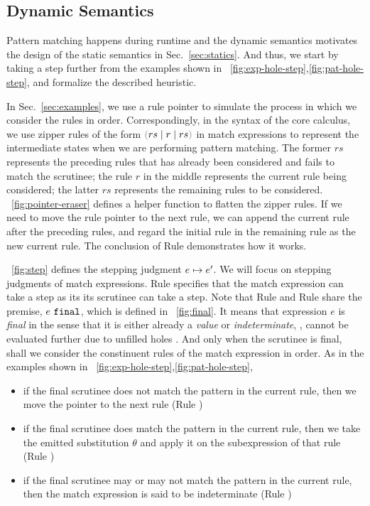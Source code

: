 \documentclass[runningheads,envcountsame,a4paper]{llncs}
\begin{document}
\subsection{Dynamic Semantics}\label{sec:dynamics}
Pattern matching happens during runtime and the dynamic semantics motivates the
design of the static semantics in Sec.~\ref{sec:statics}. And thus, we start by
taking a step further from the examples shown in
\listfigurename~\ref{fig:exp-hole-step},\ref{fig:pat-hole-step}, and formalize
the described heuristic.




In Sec.~\ref{sec:examples}, we use a rule pointer to simulate the process in
which we consider the rules in order. Correspondingly, in the syntax of the core
calculus, we use zipper rules of the form $\zrulsP{rs}{r}{rs}$ in match
expressions to represent the intermediate states when we are performing pattern
matching. The former $rs$ represents the preceding rules that has already been
considered and fails to match the scrutinee; the rule $r$ in the middle
represents the current rule being considered; the latter $rs$ represents the
remaining rules to be considered. \figurename~\ref{fig:pointer-eraser} defines a
helper function to flatten the zipper rules. If we need to move the rule pointer
to the next rule, we can append the current rule after the preceding rules, and
regard the initial rule in the remaining rule as the new current rule. The
conclusion of Rule \ITFailMatch demonstrates how it works.



\figurename~\ref{fig:step} defines the stepping judgment
$e \mapsto e'$. We will focus on stepping judgments of match expressions.
Rule \ITExpMatch specifies that the match expression can take a step as its its
scrutinee can take a step. Note that Rule \ITFailMatch and Rule \ITSuccMatch
share the premise, $e ~\mathtt{final}$, which is defined in \figurename~\ref{fig:final}. It
means that expression $e$ is \textit{final} in the sense that it is either already a
\textit{value} or \textit{indeterminate}, \ie, cannot be evaluated further due to unfilled holes
\cite{DBLP:journals/pacmpl/OmarVCH19}. And only when the scrutinee is final,
shall we consider the constinuent rules of the match expression in order. As in
the examples shown in \listfigurename~\ref{fig:exp-hole-step},\ref{fig:pat-hole-step},

\begin{itemize}
  \item
    if the final scrutinee does not match the pattern in the current rule,
    then we move the pointer to the next rule (Rule \ITFailMatch)

  \item
    if the final scrutinee does match the pattern in the current rule, 
    then we take the emitted substitution $\theta$ and apply it on the subexpression of that rule (Rule \ITSuccMatch)

  \item 
    if the final scrutinee may or may not match the pattern in the current rule,
    then the match expression is said to be indeterminate (Rule \IMatch)
\end{itemize}
\end{document}
